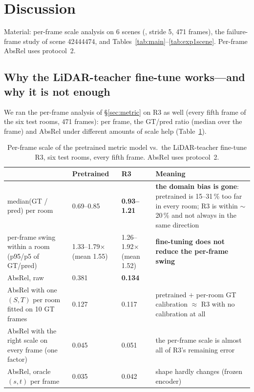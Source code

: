 \section{Discussion}\label{sec:discussion}
Material: per-frame scale analysis on 6 scenes (, stride 5, 471 frames), the failure-frame
study of scene 42444474, and Tables~\ref{tab:main}--\ref{tab:exp1scene}. Per-frame AbsRel uses protocol~2.

\subsection{Why the LiDAR-teacher fine-tune works---and why it is not enough}\label{sec:whyft}
We ran the per-frame analysis of \S\ref{sec:metric} on R3 as well (every fifth frame of the six test rooms, 471
frames): per frame, the GT/pred ratio (median over the frame) and AbsRel under different amounts of scale help
(Table~\ref{tab:whyft}).
\begin{table}[t]
\centering\small
\caption{Per-frame scale of the pretrained metric model vs.\ the LiDAR-teacher fine-tune R3, six test rooms, every fifth
frame. AbsRel uses protocol~2.}
\label{tab:whyft}
\begin{tabularx}{\textwidth}{@{}lllX@{}}
\toprule
 & Pretrained & \textbf{R3} & Meaning \\
\midrule
median(GT / pred) per room & 0.69--0.85 & \textbf{0.93--1.21} & \textbf{the domain bias is gone}: pretrained is 15--31\,\% too far in every room; R3 is within $\sim$20\,\% and not always in the same direction \\
per-frame swing within a room (p95/p5 of GT/pred) & 1.33--1.79$\times$ (mean 1.55) & 1.26--1.92$\times$ (mean 1.52) & \textbf{fine-tuning does not reduce the per-frame swing} \\
AbsRel, raw & 0.381 & \textbf{0.134} & \\
AbsRel with one $(S,T)$ per room fitted on 10 GT frames & 0.127 & 0.117 & pretrained $+$ per-room GT calibration $\approx$ R3 with no calibration at all \\
AbsRel with the right scale on every frame (one factor) & 0.045 & 0.051 & the per-frame scale is almost all of R3's remaining error \\
AbsRel, oracle $(s,t)$ per frame & 0.035 & 0.042 & shape hardly changes (frozen encoder) \\
\bottomrule
\end{tabularx}
\end{table}
